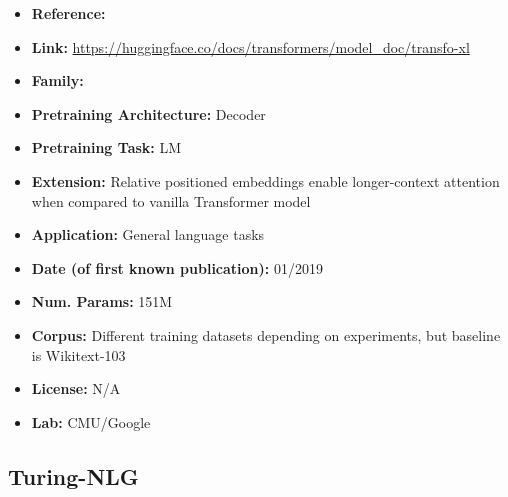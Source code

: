 \documentclass{article}
\begin{document}
            \begin{itemize}
                \item \textbf{Reference:} 
                \item \textbf{Link:} \url{https://huggingface.co/docs/transformers/model_doc/transfo-xl}
                \item \textbf{Family:} 
                \item \textbf{Pretraining Architecture:} Decoder
                \item \textbf{Pretraining Task:} LM
                \item \textbf{Extension:} Relative positioned embeddings enable longer-context attention when compared to vanilla Transformer model  
                \item \textbf{Application:} General language tasks
                \item \textbf{Date (of first known publication):} 01/2019
                \item \textbf{Num. Params:} 151M
                \item \textbf{Corpus:} Different training datasets depending on experiments, but baseline is Wikitext-103
                 \item \textbf{License:} N/A
                \item \textbf{Lab:} CMU/Google
            \end{itemize}

\subsection{Turing-NLG}
\end{document}
